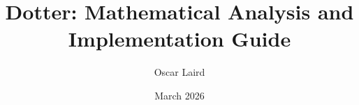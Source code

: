 \documentclass{report}
\begin{document}
\hypertarget{titlepage}{}

\title{Dotter: Mathematical Analysis and Implementation Guide}
\date{March 2026}
\author{Oscar Laird}
\maketitle

\clearpage
\hypertarget{tocpage}{}
{}
\tableofcontents
\newpage



















{}

\end{document}
